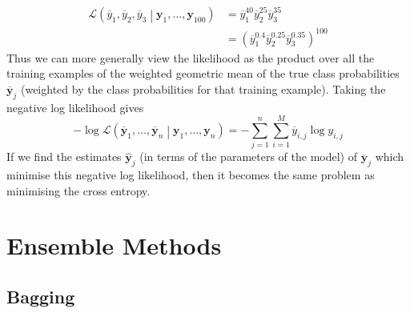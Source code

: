\documentclass[11pt]{report} %
\begin{document}
\begin{align}
\mathcal{L}\left(\overline{y}_{1}, \overline{y}_{2}, \overline{y}_{3}\middle|\mathbf{y}_{1}, \dots, \mathbf{y}_{100}\right) &= \overline{y}_{1}^{40}\overline{y}_{2}^{25}\overline{y}_{3}^{35} \\
&= \left(\overline{y}_{1}^{0.4}\overline{y}_{2}^{0.25}\overline{y}_{3}^{0.35}\right)^{100}
\end{align}
Thus we can more generally view the likelihood as the product over all the training examples of the weighted geometric mean of the true class probabilities $\overline{\mathbf{y}}_{j}$ (weighted by the class probabilities for that training example). Taking the negative log likelihood gives
\begin{equation}
-\log\mathcal{L}\left(\overline{\mathbf{y}}_{1}, \dots, \overline{\mathbf{y}}_{n}\middle|\mathbf{y}_{1}, \dots, \mathbf{y}_{n}\right) = -\sum_{j = 1}^{n}\sum_{i = 1}^{M}\overline{y}_{i, j}\log{y_{i, j}}
\end{equation}
If we find the estimates $\hat{\mathbf{y}}_{j}$ (in terms of the parameters of the model) of $\overline{\mathbf{y}}_{j}$ which minimise this negative log likelihood, then it becomes the same problem as minimising the cross entropy.

\section{Ensemble Methods}

\subsection{Bagging}
\end{document}
